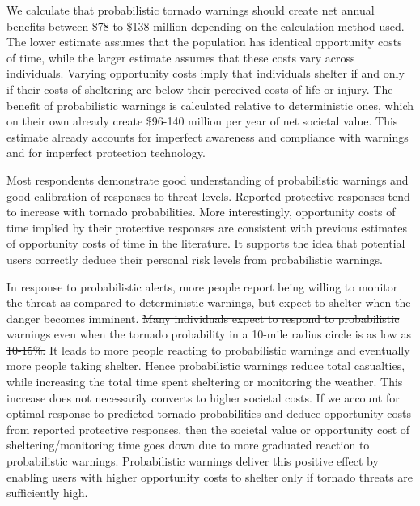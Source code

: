\documentclass{ametsocV6.1}
\begin{document}
We calculate that probabilistic tornado warnings should create net annual benefits between \$78 to \$138 million depending on the calculation method used. The lower estimate assumes that the population has identical opportunity costs of time, while the larger estimate assumes that these costs vary across individuals. Varying opportunity costs imply that individuals shelter if and only if their costs of sheltering are below their perceived costs of life or injury. The benefit of probabilistic warnings is calculated relative to deterministic ones, which on their own already create \$96-140 million per year of net societal value.  This estimate already accounts for imperfect awareness and compliance with warnings and for imperfect protection technology.

Most respondents demonstrate good understanding of probabilistic warnings and good calibration of responses to threat levels. Reported protective responses tend to increase with tornado probabilities. More interestingly, opportunity costs of time implied by their protective responses are consistent with previous estimates of opportunity costs of time in the literature. It supports the idea that potential users correctly deduce their personal risk levels from probabilistic warnings. 

In response to probabilistic alerts, more people report being willing to monitor the threat as compared to deterministic warnings, but expect to shelter when the danger becomes imminent.  \sout{Many individuals expect to respond to probabilistic warnings even when the tornado probability in a 10-mile radius circle is as low as 10-15\%.} It leads to more people reacting to probabilistic warnings and eventually more people taking shelter. Hence probabilistic warnings reduce total casualties, while increasing the total time spent sheltering or monitoring the weather. This increase does not necessarily converts to higher societal costs. If we account for optimal response to predicted tornado probabilities and deduce opportunity costs from reported protective responses, then the societal value or opportunity cost of sheltering/monitoring time goes down due to more graduated reaction to probabilistic warnings. Probabilistic warnings deliver this positive effect by enabling users with higher opportunity costs to shelter only if tornado threats are sufficiently high. 
\end{document}
